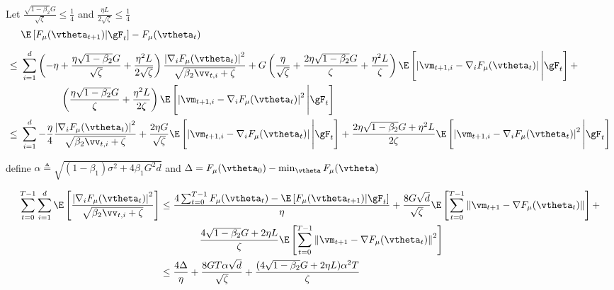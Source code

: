 Let $\frac{\sqrt{1-\beta_2}G}{\sqrt{\zeta}} \leq \frac{1}{4}$ and $\frac{\eta L}{2\sqrt{\zeta}} \leq \frac{1}{4}$
\begin{equation}
\begin{aligned}
&\E\left[F_{\mu}(\vtheta_{t+1})|\gF_t\right] - F_{\mu}(\vtheta_t) \\[5pt]
\leq\,\,& \sum_{i=1}^d\left(-\eta + \frac{\eta\sqrt{1-\beta_2}G}{\sqrt{\zeta}} + \frac{\eta^2 L}{2\sqrt{\zeta}}\right) \frac{\left|\nabla_i F_{\mu}(\vtheta_t)\right|^2}{\sqrt{\beta_2\vv_{t,i} + \zeta}} + G \left(\frac{\eta}{\sqrt{\zeta}} + \frac{2\eta\sqrt{1-\beta_2}G}{\zeta} + \frac{\eta^2 L}{\zeta} \right)\E\left[\left|\vm_{t+1,i} - \nabla_i F_{\mu}(\vtheta_t)\right|\Bigg| \gF_t\right] + \\
&\qquad \qquad \left(\frac{\eta\sqrt{1-\beta_2}G}{\zeta} + \frac{\eta^2 L}{2\zeta}\right) \E\left[\left|\vm_{t+1,i} - \nabla_i F_{\mu}(\vtheta_t)\right|^2\Bigg| \gF_t\right] \\
\leq\,\,& \sum_{i=1}^d -\frac{\eta}{4}\frac{\left|\nabla_i F_{\mu}(\vtheta_t)\right|^2}{\sqrt{\beta_2\vv_{t,i} + \zeta}} + \frac{2\eta G}{\sqrt{\zeta}}\E\left[\left|\vm_{t+1,i} - \nabla_i F_{\mu}(\vtheta_t)\right|\Bigg| \gF_t\right] + \frac{2\eta\sqrt{1-\beta_2}G + \eta^2L}{2\zeta} \E\left[\left|\vm_{t+1,i} - \nabla_i F_{\mu}(\vtheta_t)\right|^2\Bigg| \gF_t\right]
\end{aligned}
\end{equation}

define $\alpha \triangleq \sqrt{(1-\beta_1)\sigma^2 + 4\beta_1G^2d}$ and $\Delta = F_{\mu}(\vtheta_0) - \min_{\vtheta} F_{\mu}(\vtheta)$

\begin{equation}
\begin{aligned}
\sum_{t=0}^{T-1}\sum_{i=1}^d\E\left[\frac{\left|\nabla_i F_{\mu}(\vtheta_t)\right|^2}{\sqrt{\beta_2\vv_{t,i} + \zeta}}\right] &\leq \frac{4\sum_{t=0}^{T-1}F_{\mu}(\vtheta_t) - \E\left[F_{\mu}(\vtheta_{t+1})|\gF_t\right]}{\eta} + \frac{8G\sqrt{d}}{\sqrt{\zeta}}\E\left[\sum_{t=0}^{T-1}\left\|\vm_{t+1} - \nabla F_{\mu}(\vtheta_t)\right\|\right] + \\
&\qquad \qquad \frac{4\sqrt{1-\beta_2}G + 2\eta L}{\zeta} \E\left[\sum_{t=0}^{T-1}\left\|\vm_{t+1} - \nabla F_{\mu}(\vtheta_t)\right\|^2\right] \\
&\leq \frac{4\Delta}{\eta} + \frac{8GT\alpha\sqrt{d}}{\sqrt{\zeta}} +  \frac{(4\sqrt{1-\beta_2}G + 2\eta L)\alpha^2 T}{\zeta}\\
\end{aligned}
\end{equation}

